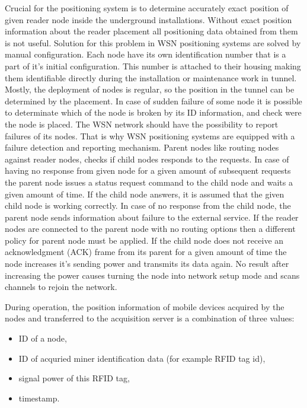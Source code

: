 \documentclass[../main.tex]{subfiles}
\begin{document}
Crucial for the positioning system is to determine accurately exact position of given reader node inside the underground installations. Without exact position information about the reader placement all positioning data obtained from them is not useful. Solution for this problem in WSN positioning systems are solved by manual configuration. Each node have its own identification number that is a part of it's initial configuration. This number is attached to their housing making them identifiable directly during the installation or maintenance work in tunnel. Mostly, the deployment of nodes is regular, so the position in the tunnel can be determined by the placement. In case of sudden failure of some node it is possible to determinate which of the node is broken by its ID information, and check were the node is placed. The WSN network should have the possibility to report failures of its nodes. That is why WSN positioning systems are equipped with a failure detection and reporting mechanism. Parent nodes like routing nodes against reader nodes, checks if child nodes responds to the requests. In case of having no response from given node for a given amount of subsequent requests the parent node issues a status request command to the child node and waits a given amount of time. If the child node answers, it is assumed that the given child node is working correctly. In case of no response from the child node, the parent node sends information about failure to the external service. If the reader nodes are connected to the parent node with no routing options then a different policy for parent node must be applied. If the child node does not receive an acknowledgment (ACK) frame from its parent for a given amount of time the node increases it's sending power and transmits its data again. No result after increasing the power causes turning the node into network setup mode and scans channels to rejoin the network.

During operation, the position information of mobile devices acquired by the nodes and transferred to the acquisition server is a combination of three values:
\begin{itemize}
	\item ID of a node,
	\item ID of acquried miner identification data (for example RFID tag id),
	\item signal power of this RFID tag,
	\item timestamp.
\end{itemize}
\end{document}
